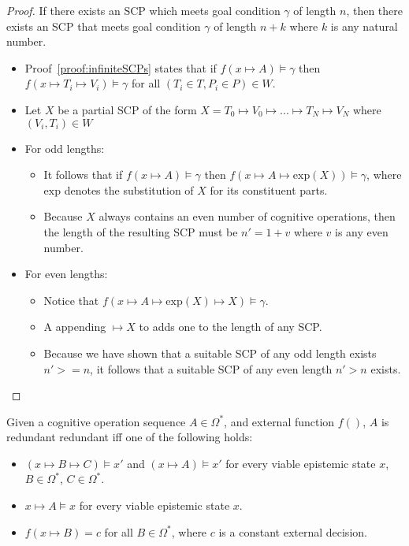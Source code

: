 \begin{proof} \label{proof:infiniteSCPLength}
If there exists an SCP which meets goal condition $\gamma$ of length $n$, then there exists an SCP that meets goal condition $\gamma$ of length $n+k$ where $k$ is any natural number.
\begin{itemize}

\item Proof~\ref{proof:infiniteSCPs} states that if $f(x \longmapsto A)\models \gamma$ then $f(x \longmapsto T_i \longmapsto V_i)\models \gamma$ for all $(T_i \in T, P_i \in P) \in W$.
\item Let $X$ be a partial SCP of the form $X=T_0 \longmapsto V_0 \longmapsto ... \longmapsto T_N \longmapsto V_{N}$ where $(V_i, T_i) \in W$
\item For odd lengths:
\begin{itemize}
\item  It follows that if $f(x \longmapsto A)\models \gamma$ then $f(x \longmapsto A \longmapsto \textrm{exp}(X))\models \gamma$, where $\textrm{exp}$ denotes the substitution of $X$ for its constituent parts.
\item Because $X$ always contains an even number of cognitive operations, then the length of the resulting SCP must be $n' = 1+v$ where $v$ is any even number.
\end{itemize}
\item For even lengths:
\begin{itemize}
\item Notice that $f(x \longmapsto A \longmapsto \textrm{exp}(X) \longmapsto X) \models \gamma$.
\item A appending $\longmapsto X$ to adds one to the length of any SCP.
\item Because we have shown that a suitable SCP of any odd length exists $n'>=n$, it follows that a suitable SCP of any even length $n'>n$ exists.
\end{itemize}
\end{itemize}

\end{proof}

\begin{lemma} \label{lem:uniredundant}
Given a cognitive operation sequence $A \in \Omega^*$, and external function $f()$, $A$ is redundant redundant iff one of the following holds:
\begin{itemize}
\item $(x \longmapsto B \longmapsto C) \models x'$ and $(x \longmapsto A) \models x'$ for every viable epistemic state $x$, $B \in \Omega^*$, $C \in \Omega^*$. 
\item $x \longmapsto A \models x$ for every viable epistemic state $x$.
\item $f(x \longmapsto B)=c$ for all $B \in \Omega^*$, where $c$ is a constant external decision.
\end{itemize}
\end{lemma}

